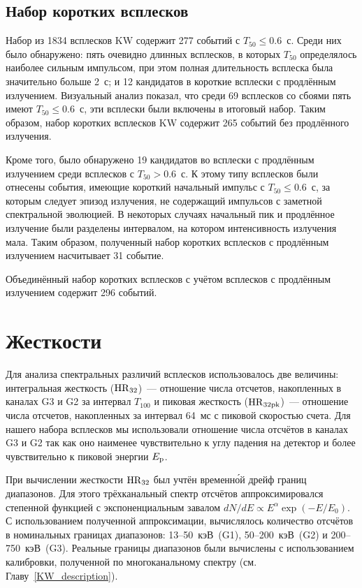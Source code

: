 \subsection{Набор коротких всплесков}
Набор из 1834 всплесков KW содержит 277 событий с $T_{50} \leq 0.6$~с.    %
Среди них было обнаружено: пять очевидно длинных всплесков, в которых $T_{50}$ 
определялось наиболее сильным импульсом, при этом полная длительность всплеска была 
значительно больше 2~с; и 12 кандидатов в короткие всплески с продлённым излучением.
Визуальный анализ показал, что среди 69 всплесков со сбоями пять имеют $T_{50} \leq 0.6$~с, 
эти всплески были включены в итоговый набор. 
Таким образом, набор коротких всплесков KW содержит 265 событий без продлённого излучения.

Кроме того, было обнаружено 19 кандидатов во всплески с продлённым излучением среди всплесков с $T_{50} > 0.6$~с. 
К этому типу всплесков были отнесены события, имеющие короткий начальный импульс с $T_{50} \leq 0.6$~с, 
за которым следует эпизод излучения, не содержащий импульсов с заметной спектральной эволюцией. 
В некоторых случаях начальный пик и продлённое излучение были разделены интервалом, 
на котором интенсивность излучения мала. Таким образом, полученный набор коротких всплесков с 
продлённым излучением насчитывает 31 событие.

Объединённый набор коротких всплесков с учётом всплесков с продлённым излучением 
содержит 296 событий.
\FloatBarrier

\section{Жесткости}\label{sec:Hardness}
Для анализа спектральных различий всплесков использовалось две величины: интегральная 
жесткость (${\mathrm{HR}}_{32}$)~--- отношение числа отсчетов, накопленных в каналах G3 и G2 
за интервал $T_{100}$ и пиковая жесткость (${\mathrm{HR}}_{32{\mathrm{pk}}}$)~--- отношение числа отсчетов, 
накопленных за интервал 64~мс с пиковой скоростью счета. Для нашего набора 
всплесков мы использовали отношение числа отсчётов в каналах G3 и G2 так как 
оно наименее чувствительно к углу падения на детектор и более чувствительно 
к пиковой энергии $E_{\mathrm{p}}$.  

При вычислении жесткости ${\mathrm{HR}}_{32}$ был учтён временн\'{о}й дрейф границ диапазонов. 
Для этого трёхканальный спектр отсчётов аппроксимировался степенной функцией 
с экспоненциальным завалом $dN/dE \propto E^{\alpha} \exp(-E/E_0)$. 
С использованием полученной аппроксимации, вычислялось количество отсчётов в номинальных 
границах диапазонов: 13--50~кэВ~(G1), 50--200~кэВ~(G2) и 200--750~кэВ~(G3). 
Реальные границы диапазонов были вычислены с использованием калибровки, полученной 
по многоканальному спектру (см. Главу~\ref{KW_description}).

